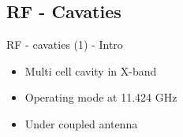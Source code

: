 \documentclass{beamer}
\begin{document}
\subsection{RF - Cavaties}
\begin{frame}[t,fragile]{RF - cavaties (1) - Intro}
\begin{itemize}
\item Multi cell cavity in X-band
\item Operating mode at 11.424 GHz
\item Under coupled antenna
\end{itemize}

\begin{figure}
  \centering
  \quad
  \\
\end{figure}

\end{frame}
\end{document}
